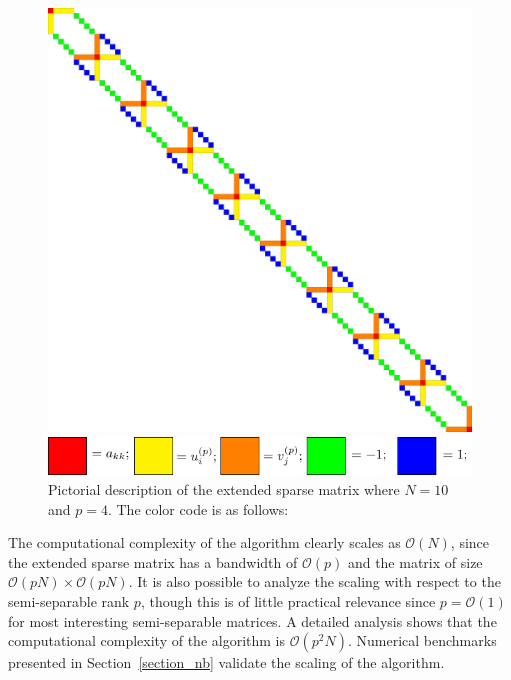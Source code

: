 \documentclass[final,leqno]{siamltex}
\begin{document}
\begin{figure}[!htbp]
\begin{center}
\includegraphics[scale=0.225]{./images/mtermsemiseparable_matrix.pdf}
\end{center}
\begin{center}
\includegraphics[scale=1]{./images/colorcode.pdf}
\end{center}
\caption{Pictorial description of the extended sparse matrix where $N=10$ and $p=4$. The color code is as follows: }
\label{fig_rankm_semiseparable}
\end{figure}

The computational complexity of the algorithm clearly scales as $\mathcal{O}(N)$, since the extended sparse matrix has a bandwidth of $\mathcal{O}(p)$ and the matrix of size $\mathcal{O}(pN) \times \mathcal{O}(pN)$. It is also possible to analyze the scaling with respect to the semi-separable rank $p$, though this is of little practical relevance since $p = \mathcal{O}(1)$ for most interesting semi-separable matrices. A detailed analysis shows that the computational complexity of the algorithm is $\mathcal{O}(p^2N)$. Numerical benchmarks presented in Section~\ref{section_nb} validate the scaling of the algorithm.
\end{document}
